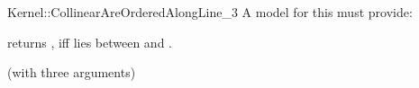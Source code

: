 \begin{ccRefFunctionObjectConcept}{Kernel::CollinearAreOrderedAlongLine_3}
A model for this must provide:


         {returns , iff  lies between  
          and . }

\ccRefines
{} (with three arguments)

\ccSeeAlso

  \\

\end{ccRefFunctionObjectConcept}
